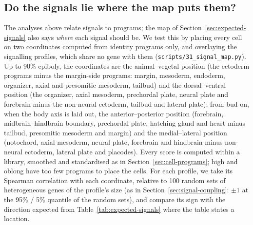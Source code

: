 \documentclass[11pt,a4paper]{article}
\begin{document}
\subsection{Do the signals lie where the map puts them?}
\label{sec:signal-map}

The analyses above relate signals to programs; the map of Section~\ref{sec:expected-signals} also says \emph{where} each signal should be. We test this by placing every cell on two coordinates computed from identity programs only, and overlaying the signalling profiles, which share no gene with them (\nolinkurl{scripts/31_signal_map.py}). Up to 90\% epiboly, the coordinates are the animal--vegetal position (the ectoderm programs minus the margin-side programs: margin, mesoderm, endoderm, organizer, axial and presomitic mesoderm, tailbud) and the dorsal--ventral position (the organizer, axial mesoderm, prechordal plate, neural plate and forebrain minus the non-neural ectoderm, tailbud and lateral plate); from bud on, when the body axis is laid out, the anterior--posterior position (forebrain, midbrain--hindbrain boundary, prechordal plate, hatching gland and heart minus tailbud, presomitic mesoderm and margin) and the medial--lateral position (notochord, axial mesoderm, neural plate, forebrain and hindbrain minus non-neural ectoderm, lateral plate and placodes). Every score is computed within a library, smoothed and standardised as in Section~\ref{sec:cell-programs}; high and oblong have too few programs to place the cells. For each profile, we take its Spearman correlation with each coordinate, relative to 100 random sets of heterogeneous genes of the profile's size (as in Section~\ref{sec:signal-coupling}: $\pm1$ at the 95\% / 5\% quantile of the random sets), and compare its sign with the direction expected from Table~\ref{tab:expected-signals} where the table states a location.
\end{document}
